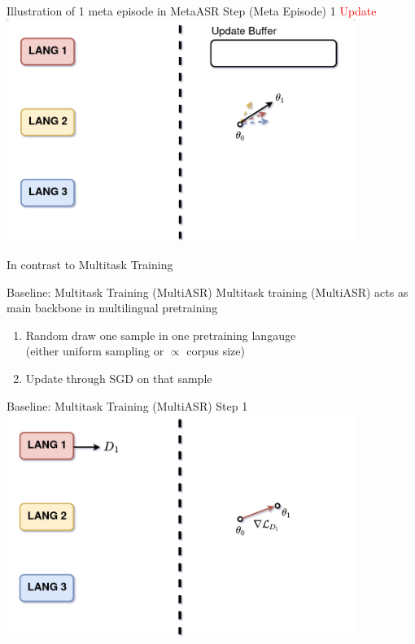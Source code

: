 \documentclass{beamer}
\begin{document}
\begin{frame}[t]{Illustration of 1 meta episode in MetaASR}
  Step (Meta Episode) 1 \textcolor{red}{Update}
  \center \includegraphics[width=0.85\textwidth]{fig/meta_update.png}
\end{frame}

\begin{frame}
	\begin{center}
    \LARGE{In contrast to Multitask Training}
	\end{center}
\end{frame}

\begin{frame}[t]{Baseline: Multitask Training (MultiASR)}
  Multitask training (MultiASR) acts as main backbone in multilingual pretraining
  \vspace{2em}
  \begin{enumerate}
    \item Random draw one sample in one pretraining langauge \\ (either uniform sampling or $\propto$ corpus size)
    \item Update through SGD on that sample
  \end{enumerate}
\end{frame}

\begin{frame}[t]{Baseline: Multitask Training (MultiASR)}
  Step 1 
  \center \includegraphics[width=0.85\textwidth]{fig/multi_step1.png}
\end{frame}
\end{document}
